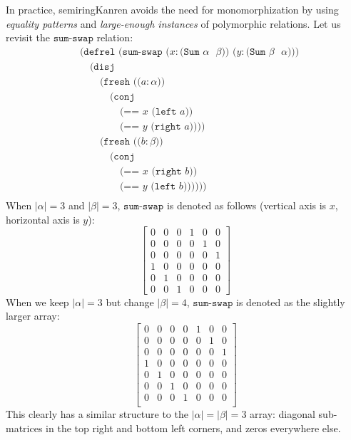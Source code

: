 \documentclass{report}
\theoremstyle{definition}
\begin{document}
In practice, semiringKanren avoids the need for monomorphization by using \emph{equality patterns} and \emph{large-enough instances} of polymorphic relations.
Let us revisit the \(\texttt{sum-swap}\) relation:
\begin{equation}
\begin{aligned}
	& \texttt{(defrel (sum-swap (\(x : \texttt{(Sum \(\alpha\) \(\beta\))}\)) (\(y : \texttt{(Sum \(\beta\) \(\alpha\))}\)))} \\
	& \quad \texttt{(disj} \\
	& \quad \quad \texttt{(fresh ((\(a : \alpha\)))} \\
	& \quad \quad \quad \texttt{(conj} \\
	& \quad \quad \quad \quad \texttt{(== \(x\) (left \(a\)))} \\
	& \quad \quad \quad \quad \texttt{(== \(y\) (right \(a\)))))} \\
	& \quad \quad \texttt{(fresh ((\(b : \beta\)))} \\
	& \quad \quad \quad \texttt{(conj} \\
	& \quad \quad \quad \quad \texttt{(== \(x\) (right \(b\)))} \\
	& \quad \quad \quad \quad \texttt{(== \(y\) (left \(b\)))))))} \\
\end{aligned}
\end{equation}
When \(|\alpha| = 3\) and \(|\beta| = 3\), \(\texttt{sum-swap}\) is denoted as follows (vertical axis is \(x\), horizontal axis is \(y\)):
\begin{equation}
	\begin{bmatrix}
		0 & 0 & 0 & 1 & 0 & 0 \\
		0 & 0 & 0 & 0 & 1 & 0 \\
		0 & 0 & 0 & 0 & 0 & 1 \\
		1 & 0 & 0 & 0 & 0 & 0 \\
		0 & 1 & 0 & 0 & 0 & 0 \\
		0 & 0 & 1 & 0 & 0 & 0
	\end{bmatrix}
\end{equation}
When we keep \(|\alpha| = 3\) but change \(|\beta| = 4\), \(\texttt{sum-swap}\) is denoted as the slightly larger array:
\begin{equation}
	\begin{bmatrix}
		0 & 0 & 0 & 0 & 1 & 0 & 0 \\
		0 & 0 & 0 & 0 & 0 & 1 & 0 \\
		0 & 0 & 0 & 0 & 0 & 0 & 1 \\
		1 & 0 & 0 & 0 & 0 & 0 & 0 \\
		0 & 1 & 0 & 0 & 0 & 0 & 0 \\
		0 & 0 & 1 & 0 & 0 & 0 & 0 \\
		0 & 0 & 0 & 1 & 0 & 0 & 0 \\
	\end{bmatrix}
\end{equation}
This clearly has a similar structure to the \(|\alpha|=|\beta|=3\) array: diagonal sub-matrices in the top right and bottom left corners, and zeros everywhere else.
\end{document}

